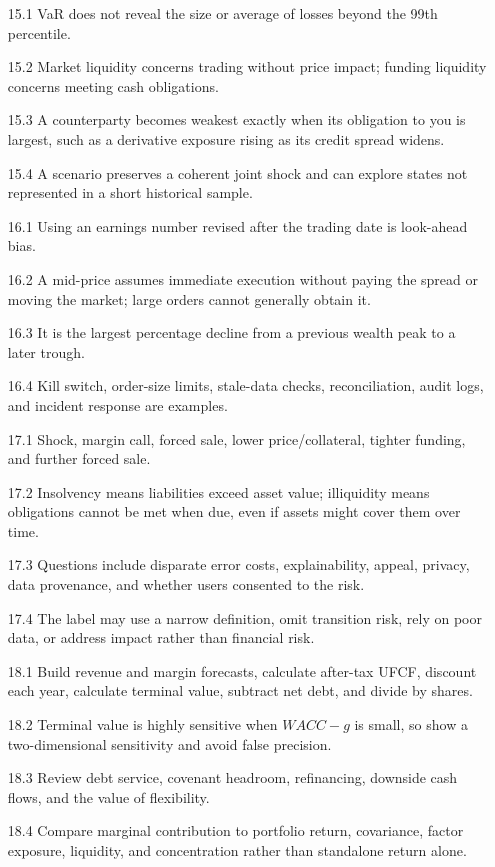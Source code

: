 \begin{enumerate}
  \item[15.1] VaR does not reveal the size or average of losses beyond the 99th percentile.
  \item[15.2] Market liquidity concerns trading without price impact; funding liquidity concerns meeting cash obligations.
  \item[15.3] A counterparty becomes weakest exactly when its obligation to you is largest, such as a derivative exposure rising as its credit spread widens.
  \item[15.4] A scenario preserves a coherent joint shock and can explore states not represented in a short historical sample.
  \item[16.1] Using an earnings number revised after the trading date is look-ahead bias.
  \item[16.2] A mid-price assumes immediate execution without paying the spread or moving the market; large orders cannot generally obtain it.
  \item[16.3] It is the largest percentage decline from a previous wealth peak to a later trough.
  \item[16.4] Kill switch, order-size limits, stale-data checks, reconciliation, audit logs, and incident response are examples.
  \item[17.1] Shock, margin call, forced sale, lower price/collateral, tighter funding, and further forced sale.
  \item[17.2] Insolvency means liabilities exceed asset value; illiquidity means obligations cannot be met when due, even if assets might cover them over time.
  \item[17.3] Questions include disparate error costs, explainability, appeal, privacy, data provenance, and whether users consented to the risk.
  \item[17.4] The label may use a narrow definition, omit transition risk, rely on poor data, or address impact rather than financial risk.
  \item[18.1] Build revenue and margin forecasts, calculate after-tax UFCF, discount each year, calculate terminal value, subtract net debt, and divide by shares.
  \item[18.2] Terminal value is highly sensitive when $WACC-g$ is small, so show a two-dimensional sensitivity and avoid false precision.
  \item[18.3] Review debt service, covenant headroom, refinancing, downside cash flows, and the value of flexibility.
  \item[18.4] Compare marginal contribution to portfolio return, covariance, factor exposure, liquidity, and concentration rather than standalone return alone.
\end{enumerate}

